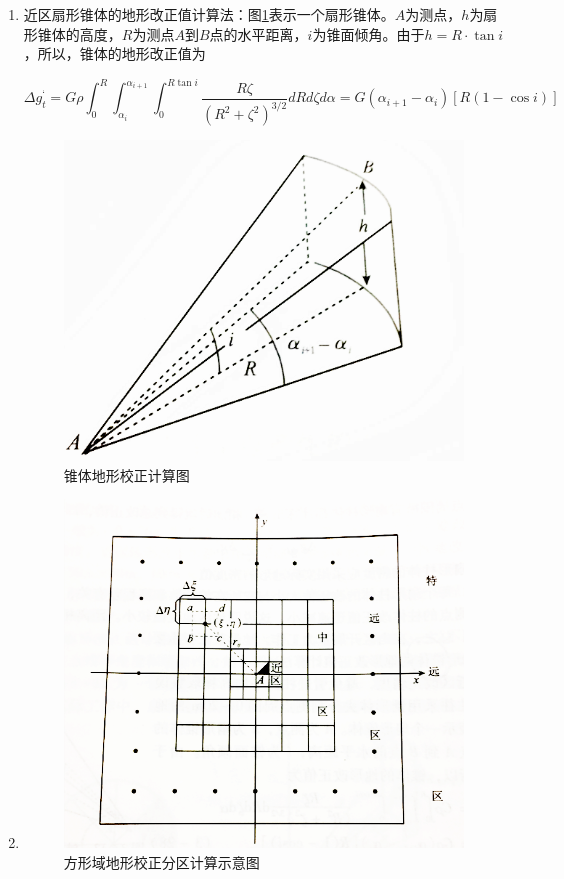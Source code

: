 \begin{enumerate}
	\item 近区扇形锥体的地形改正值计算法：图\ref{锥体地形校正图}表示一个扇形锥体。$A$为测点，$h$为扇形锥体的高度，$R$为测点$A$到$B$点的水平距离，$i$为锥面倾角。由于$h=R\cdot \tan i$，所以，锥体的地形改正值为
	
	\begin{equation}
		\varDelta g_{t}^{}  =G\rho \int_0^R{\int_{\alpha _i}^{\alpha _{i+1}}{\int_0^{R\tan i}{\frac{R\zeta}{\left( R^2+\zeta ^2 \right) ^{\text{3/}2}}dRd\zeta d\alpha}} =G\left( \alpha _{i+1}-\alpha _i \right) \left[ R\left( 1-\cos i \right) \right]}
	\end{equation}
	
	\begin{figure}
		\centering
		\label{锥体地形校正图}
		\includegraphics[scale = 0.7]{figures/jinqu.png}
		\caption{锥体地形校正计算图}
	\end{figure}
	\item 
	\begin{figure}
		\centering
		\label{fangxing}
		\includegraphics[scale = 0.7]{figures/fangxing.png}
		\caption{方形域地形校正分区计算示意图}
	\end{figure}


\end{enumerate}

